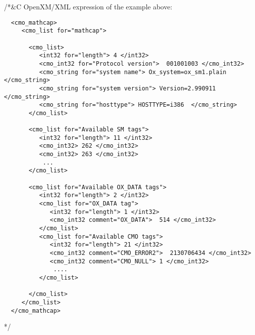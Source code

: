 /*&C
\noindent
OpenXM/XML expression of the example above:
\begin{verbatim}
  <cmo_mathcap>
     <cmo_list for="mathcap">

       <cmo_list>
          <int32 for="length"> 4 </int32>
          <cmo_int32 for="Protocol version">  001001003 </cmo_int32>
          <cmo_string for="system name"> Ox_system=ox_sm1.plain  </cmo_string>
          <cmo_string for="system version"> Version=2.990911  </cmo_string>
          <cmo_string for="hosttype"> HOSTTYPE=i386  </cmo_string>
       </cmo_list>

       <cmo_list for="Available SM tags">
          <int32 for="length"> 11 </int32>
          <cmo_int32> 262 </cmo_int32> 
          <cmo_int32> 263 </cmo_int32> 
           ...
       </cmo_list>

       <cmo_list for="Available OX_DATA tags">
          <int32 for="length"> 2 </int32>
          <cmo_list for="OX_DATA tag">
             <int32 for="length"> 1 </int32>
             <cmo_int32 comment="OX_DATA">  514 </cmo_int32>
          </cmo_list>
          <cmo_list for="Available CMO tags">
             <int32 for="length"> 21 </int32>
             <cmo_int32 comment="CMO_ERROR2">  2130706434 </cmo_int32>
             <cmo_int32 comment="CMO_NULL"> 1 </cmo_int32>
              ....
          </cmo_list>

       </cmo_list>
     </cmo_list>
  </cmo_mathcap>
\end{verbatim}
*/

